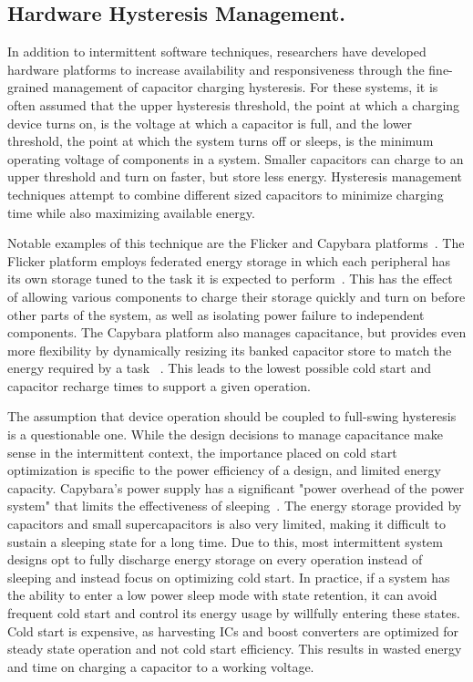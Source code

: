 \subsection{Hardware Hysteresis Management.}
In addition to intermittent software techniques, researchers have developed
hardware platforms to
increase availability and responsiveness through the fine-grained management
of capacitor charging hysteresis.
For these systems,
it is often assumed that the upper hysteresis threshold, the point at which a
charging device turns on, is the voltage at which a capacitor is full, and the
lower threshold, the point at which the system turns off or sleeps, is the minimum
operating voltage of components in a system.
Smaller capacitors can charge to an upper
threshold and turn on faster, but store less energy.  Hysteresis management
techniques attempt to combine different sized capacitors to
minimize charging time while also maximizing available energy.

Notable examples of this technique are the Flicker and Capybara platforms~\cite{hesterFlicker17, colinReconfigurable18}.
The Flicker
platform employs federated
energy storage in which each peripheral has its own storage tuned to the task
it is expected to perform~\cite{hesterTragedy15,hesterFlicker17}. This has the
effect of allowing various components to charge their storage quickly and turn on before other parts of the system, as well
as isolating power failure to independent components.  
The Capybara platform also manages capacitance,  
but provides even more flexibility by dynamically resizing its banked
capacitor store to match the energy required by a task
~\cite{colinReconfigurable18}. This leads to the lowest possible cold start and capacitor recharge times to support a given operation.

The assumption that device operation should be coupled to full-swing hysteresis is a questionable one. 
While the design decisions to manage capacitance make sense in the intermittent context, the importance placed on cold start optimization is specific to the power efficiency of a design, and limited energy capacity. 
Capybara's power supply has a significant
"power overhead of the power system" that limits the effectiveness of
sleeping~\cite{colinReconfigurable18}. The energy storage provided by capacitors and small supercapacitors is also very limited, making it difficult to sustain a sleeping state for a long time. 
Due to this, most intermittent system designs opt to fully discharge energy storage on every operation instead of sleeping and instead focus on optimizing cold start.  
In practice, if a system has the ability to enter a low power sleep mode with state retention, it can avoid frequent cold start and control its energy usage by willfully entering these
states. 
Cold start is expensive, as harvesting ICs and boost converters are optimized for steady state operation and not cold start efficiency. This results in wasted energy and time on charging a capacitor to a working voltage.

